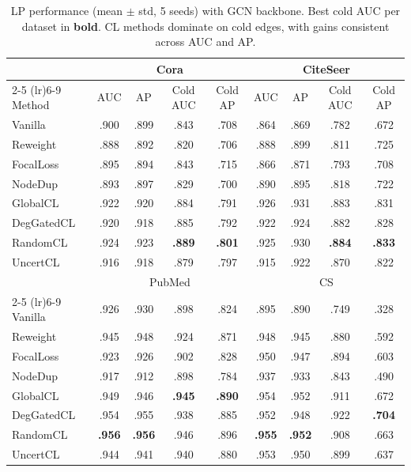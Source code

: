 \begin{table}[t]
\centering
\small
\caption{LP performance (mean $\pm$ std, 5 seeds) with GCN backbone. Best cold AUC per dataset in \textbf{bold}. CL methods dominate on cold edges, with gains consistent across AUC and AP.}
\label{tab:main_gcn}
\begin{tabular}{l cccc cccc}
\toprule
& \multicolumn{4}{c}{Cora} & \multicolumn{4}{c}{CiteSeer} \\
\cmidrule(lr){2-5} \cmidrule(lr){6-9}
Method & AUC & AP & Cold AUC & Cold AP & AUC & AP & Cold AUC & Cold AP \\
\midrule
Vanilla & .900 & .899 & .843 & .708 & .864 & .869 & .782 & .672 \\
Reweight & .888 & .892 & .820 & .706 & .888 & .899 & .811 & .725 \\
FocalLoss & .895 & .894 & .843 & .715 & .866 & .871 & .793 & .708 \\
NodeDup & .893 & .897 & .829 & .700 & .890 & .895 & .818 & .722 \\
GlobalCL & .922 & .920 & .884 & .791 & .926 & .931 & .883 & .831 \\
DegGatedCL & .920 & .918 & .885 & .792 & .922 & .924 & .882 & .828 \\
RandomCL & .924 & .923 & \textbf{.889} & \textbf{.801} & .925 & .930 & \textbf{.884} & \textbf{.833} \\
UncertCL & .916 & .918 & .879 & .797 & .915 & .922 & .870 & .822 \\
\midrule
& \multicolumn{4}{c}{PubMed} & \multicolumn{4}{c}{CS} \\
\cmidrule(lr){2-5} \cmidrule(lr){6-9}
Vanilla & .926 & .930 & .898 & .824 & .895 & .890 & .749 & .328 \\
Reweight & .945 & .948 & .924 & .871 & .948 & .945 & .880 & .592 \\
FocalLoss & .923 & .926 & .902 & .828 & .950 & .947 & .894 & .603 \\
NodeDup & .917 & .912 & .898 & .784 & .937 & .933 & .843 & .490 \\
GlobalCL & .949 & .946 & \textbf{.945} & \textbf{.890} & .954 & .952 & .911 & .672 \\
DegGatedCL & .954 & .955 & .938 & .885 & .952 & .948 & .922 & \textbf{.704} \\
RandomCL & \textbf{.956} & \textbf{.956} & .946 & .896 & \textbf{.955} & \textbf{.952} & .908 & .663 \\
UncertCL & .944 & .941 & .940 & .880 & .953 & .950 & .899 & .637 \\
\bottomrule
\end{tabular}
\end{table}

